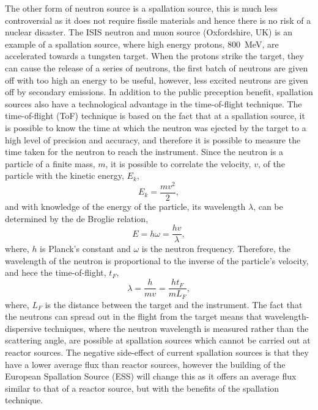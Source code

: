 The other form of neutron source is a spallation source, this is much less controversial as it does not require fissile materials and hence there is no risk of a nuclear disaster. The ISIS neutron and muon source (Oxfordshire, UK) is an example of a spallation source, where high energy protons, \SI{800}{\mega\eV},\cite{isis2016} are accelerated towards a tungsten target. When the protons strike the target, they can cause the release of a series of neutrons, the first batch of neutrons are given off with too high an energy to be useful, however, less excited neutrons are given off by secondary emissions. In addition to the public preception benefit, spallation sources also have a technological advantage in the time-of-flight technique. The time-of-flight (ToF) technique is based on the fact that at a spallation source, it is possible to know the time at which the neutron was ejected by the target to a high level of precision and accuracy, and therefore it is possible to measure the time taken for the neutron to reach the instrument. Since the neutron is a particle of a finite mass, $m$, it is possible to correlate the velocity, $v$, of the particle with the kinetic energy, $E_k$,
%
\begin{equation}
	E_k = \frac{mv^2}{2},
\end{equation}
%
and with knowledge of the energy of the particle, its wavelength $\lambda$, can be determined by the de Broglie relation,
%
\begin{equation}
	E = h\omega = \frac{hv}{\lambda},
\end{equation}
%
where, $h$ is Planck's constant and $\omega$ is the neutron frequency. Therefore, the wavelength of the neutron is proportional to the inverse of the particle's velocity, and hece the time-of-flight, $t_F$,
%
\begin{equation}
	\lambda = \frac{h}{mv} = \frac{ht_F}{mL_F},
\end{equation}
%
where, $L_F$ is the distance between the target and the instrument. The fact that the neutrons can spread out in the flight from the target means that wavelength-dispersive techniques, where the neutron wavelength is measured rather than the scattering angle, are possible at spallation sources which cannot be carried out at reactor sources. The negative side-effect of current spallation sources is that they have a lower average flux than reactor sources, however the building of the European Spallation Source (ESS) will change this as it offers an average flux similar to that of a reactor source, but with the benefits of the spallation technique.

